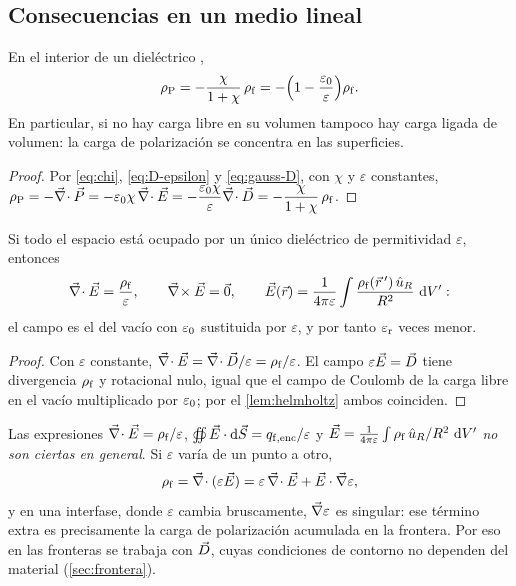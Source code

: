 \subsection{Consecuencias en un medio lineal}\label{sec:consecuencias}

\begin{proposicion}\label{prop:rhoP-rhof}
En el interior de un dieléctrico \LHI{},
\begin{equation}\label{eq:rhoP-rhof}
  \rho_{\mathrm P}=-\frac{\chi}{1+\chi}\,\rho_{\mathrm f}=-\Big(1-\frac{\varepsilon_0}{\varepsilon}\Big)\rho_{\mathrm f} .
\end{equation}
En particular, si no hay carga libre en su volumen tampoco hay carga ligada de volumen: la carga de
polarización se concentra en las superficies.
\end{proposicion}

\begin{proof}
Por \eqref{eq:chi}, \eqref{eq:D-epsilon} y \eqref{eq:gauss-D}, con $\chi$ y $\varepsilon$ constantes,
$\rho_{\mathrm P}=-\vec\nabla\!\cdot\vec P=-\varepsilon_0\chi\,\vec\nabla\!\cdot\vec E=-\dfrac{\varepsilon_0\chi}{\varepsilon}\vec\nabla\!\cdot\vec D=-\dfrac{\chi}{1+\chi}\,\rho_{\mathrm f}$.
\end{proof}

\begin{proposicion}\label{prop:un-medio}
Si todo el espacio está ocupado por un único dieléctrico \LHI{} de permitividad $\varepsilon$, entonces
\begin{equation}\label{eq:coulomb-epsilon}
  \vec\nabla\!\cdot\vec E=\frac{\rho_{\mathrm f}}{\varepsilon},\qquad \vec\nabla\!\times\vec E=\vec 0,\qquad
  \vec E(\vec r)=\frac{1}{4\pi\varepsilon}\int\frac{\rho_{\mathrm f}(\vec r\,')\,\hat u_{R}}{R^2}\,\mathop{}\!\mathrm{d} V' :
\end{equation}
el campo es el del vacío con $\varepsilon_0$ sustituida por $\varepsilon$, y por tanto $\varepsilon_{\mathrm r}$ veces menor.
\end{proposicion}

\begin{proof}
Con $\varepsilon$ constante, $\vec\nabla\!\cdot\vec E=\vec\nabla\!\cdot\vec D/\varepsilon=\rho_{\mathrm f}/\varepsilon$. El campo $\varepsilon\vec E=\vec D$ tiene divergencia $\rho_{\mathrm f}$ y rotacional
nulo, igual que el campo de Coulomb de la carga libre en el vacío multiplicado por $\varepsilon_0$; por el
\cref{lem:helmholtz} ambos coinciden.
\end{proof}

\begin{trampa}
Las expresiones $\vec\nabla\!\cdot\vec E=\rho_{\mathrm f}/\varepsilon$, $\oiint\vec E\cdot\mathop{}\!\mathrm{d}\vec S=q_{\mathrm{f,enc}}/\varepsilon$ y $\vec E=\frac{1}{4\pi\varepsilon}\int\rho_{\mathrm f}\,\hat u_{R}/R^2\,\mathop{}\!\mathrm{d} V'$ \emph{no son
ciertas en general}. Si $\varepsilon$ varía de un punto a otro,
\[
  \rho_{\mathrm f}=\vec\nabla\!\cdot(\varepsilon\vec E)=\varepsilon\,\vec\nabla\!\cdot\vec E+\vec E\cdot\vec\nabla\varepsilon ,
\]
y en una interfase, donde $\varepsilon$ cambia bruscamente, $\vec\nabla\varepsilon$ es singular: ese término extra es precisamente la
carga de polarización acumulada en la frontera. Por eso en las fronteras se trabaja con $\vec D$, cuyas
condiciones de contorno no dependen del material (\cref{sec:frontera}).
\end{trampa}

